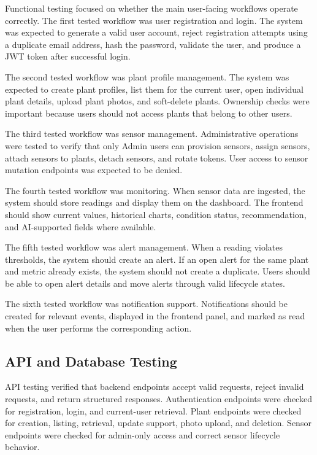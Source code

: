 Functional testing focused on whether the main user-facing workflows operate correctly. The first tested workflow was user registration and login. The system was expected to generate a valid user account, reject registration attempts using a duplicate email address, hash the password, validate the user, and produce a JWT token after successful login.

The second tested workflow was plant profile management. The system was expected to create plant profiles, list them for the current user, open individual plant details, upload plant photos, and soft-delete plants. Ownership checks were important because users should not access plants that belong to other users.

The third tested workflow was sensor management. Administrative operations were tested to verify that only Admin users can provision sensors, assign sensors, attach sensors to plants, detach sensors, and rotate tokens. User access to sensor mutation endpoints was expected to be denied.

The fourth tested workflow was monitoring. When sensor data are ingested, the system should store readings and display them on the dashboard. The frontend should show current values, historical charts, condition status, recommendation, and AI-supported fields where available.

The fifth tested workflow was alert management. When a reading violates thresholds, the system should create an alert. If an open alert for the same plant and metric already exists, the system should not create a duplicate. Users should be able to open alert details and move alerts through valid lifecycle states.

The sixth tested workflow was notification support. Notifications should be created for relevant events, displayed in the frontend panel, and marked as read when the user performs the corresponding action.

\subsection{API and Database Testing}
\label{subsec:api-database-testing}

API testing verified that backend endpoints accept valid requests, reject invalid requests, and return structured responses. Authentication endpoints were checked for registration, login, and current-user retrieval. Plant endpoints were checked for creation, listing, retrieval, update support, photo upload, and deletion. Sensor endpoints were checked for admin-only access and correct sensor lifecycle behavior.

